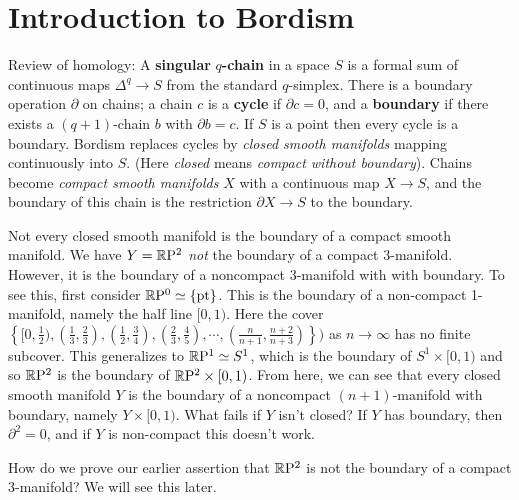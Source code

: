 \section{Introduction to Bordism} 

Review of homology: A \textbf{singular} $q$\textbf{-chain} in a space $S$ is a formal sum of continuous maps $\Delta ^q \to S$ from the standard $q$-simplex. There is a boundary operation $\partial $ on chains; a chain $c$ is a \textbf{cycle} if $\partial c=0$, and a \textbf{boundary}  if there exists a $(q+1)$-chain $b$ with $\partial b=c$. If $S$ is a point then every cycle is a boundary. Bordism replaces cycles by \emph{closed smooth manifolds} mapping continuously into $S$. (Here \emph{closed} means \emph{compact without boundary}). Chains become \emph{compact smooth manifolds}  $X$ with a continuous map $X \to S$, and the boundary of this chain is the restriction $\partial  X \to S$ to the boundary.

\begin{example}
    Not every closed smooth manifold is the boundary of a compact smooth manifold. We have $Y= \mathbb{R} \mathrm P^2$ \emph{not} the boundary of a compact 3-manifold. However, it is the boundary of a noncompact 3-manifold with with boundary. To see this, first consider $\mathbb{R} \mathrm P^0\simeq \{\text{pt} \} $. This is the boundary of a non-compact 1-manifold, namely the half line $[0,1)$. Here the cover $\left\{[0,\frac{1}{2}),(\frac{1}{3},\frac{2}{3}),(\frac{1}{2},\frac{3}{4}),(\frac{2}{3},\frac{4}{5}),\cdots ,(\frac{n}{n+1},\frac{n+2}{n+3})\right\}) $ as $n\to \infty$ has no finite subcover. This generalizes to $\mathbb{R} \mathrm P^1\simeq S^1 $, which is the boundary of $S^1  \times [0,1)$ and so $\mathbb{R} \mathrm P^2$ is the boundary of $\mathbb{R} \mathrm P^2 \times [0,1)$. From here, we can see that every closed smooth manifold $Y$ is the boundary of a noncompact $(n+1)$-manifold with boundary, namely $Y \times [0,1)$.  What fails if $Y$ isn't closed? If $Y$ has boundary, then $\partial ^2=0$, and if $Y$ is non-compact this doesn't work. 

    How do we prove our earlier assertion that $\mathbb{R} \mathrm P^2$ is not the boundary of a compact 3-manifold? We will see this later.
\end{example}

